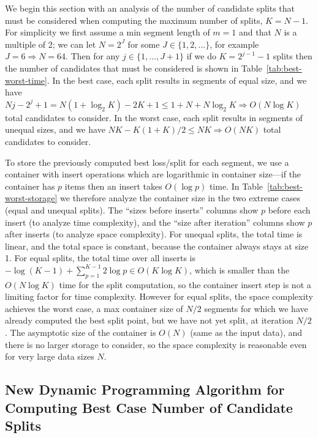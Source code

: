 \documentclass[algorithms,article,accept,oneauthor]{Definitions/mdpi}
\begin{document}
We begin this section with an analysis of the number of candidate splits that must be considered when computing the maximum number of splits, $K=N-1$. 
For simplicity we first assume a min segment length of $m=1$ and that $N$ is a multiple of 2; we can let $N=2^J$ for some $J\in\{1,2,\dots\}$, for example $J=6
  \Rightarrow N=64$.
Then for any $j\in\{1,\dots,J+1\}$ if we do $K=2^{j-1}-1$ splits then the number of candidates that must be considered is shown in Table~\ref{tab:best-worst-time}.
In the best case, each split results in segments of equal size, and we have $Nj -2^j + 1 = N(1+\log_2 K) -2K +1\leq 1+N+N\log_2 K \Rightarrow O(N \log K)$ total candidates to consider.
In the worst case, each split results in segments of unequal sizes, and we have $NK - K(1+K)/2\leq NK \Rightarrow O(NK)$ total candidates to consider.
 
To store the previously computed best loss/split for each segment, we use a container with insert operations which are logarithmic in container size---if the container has $p$ items then an insert takes $O(\log p)$ time. 
In Table~\ref{tab:best-worst-storage} we therefore analyze the container size in the two extreme cases (equal and unequal splits). 
The ``sizes before inserts'' columns show $p$ before each insert (to analyze time complexity), and the ``size after iteration'' columns show $p$ after inserts (to analyze space complexity). 
For unequal splits, the total time is linear, and the total space is constant, because the container always stays at size 1.
For equal splits, the total time over all inserts is $-\log(K-1) + \sum_{p=1}^{K-1} 2\log p\in O(K\log K)$, which is smaller than the $O(N\log K)$ time for the split computation, so the container insert step is not a limiting factor for time complexity.
However for equal splits, the space complexity achieves the worst case, a max container size of $N/2$ segments for which we have already computed the best split point, but we have not yet split, at iteration $N/2$.
{The asymptotic size of the container is $O(N)$ (same as the input data), and there is no larger storage to consider, so the space complexity is reasonable even for very large data sizes $N$.
}

\subsection{New Dynamic Programming Algorithm for Computing Best Case Number of Candidate Splits}
\label{sec:time-complexity}
\end{document}
